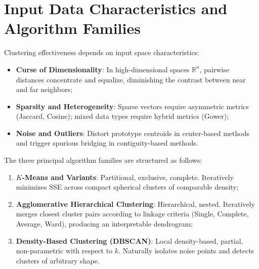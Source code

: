 \section{Input Data Characteristics and Algorithm Families}
\label{sec:dm-data-characteristics-algorithms}

Clustering effectiveness depends on input space characteristics:
\begin{itemize}
    \item \textbf{Curse of Dimensionality}: In high-dimensional spaces $\mathbb{R}^n$, pairwise distances concentrate and equalize, diminishing the contrast between near and far neighbors;
    \item \textbf{Sparsity and Heterogeneity}: Sparse vectors require asymmetric metrics (Jaccard, Cosine); mixed data types require hybrid metrics (Gower);
    \item \textbf{Noise and Outliers}: Distort prototype centroids in center-based methods and trigger spurious bridging in contiguity-based methods.
\end{itemize}

The three principal algorithm families are structured as follows:
\begin{enumerate}
    \item \textbf{$K$-Means and Variants}: Partitional, exclusive, complete. Iteratively minimizes SSE across compact spherical clusters of comparable density;
    \item \textbf{Agglomerative Hierarchical Clustering}: Hierarchical, nested. Iteratively merges closest cluster pairs according to linkage criteria (Single, Complete, Average, Ward), producing an interpretable dendrogram;
    \item \textbf{Density-Based Clustering (DBSCAN)}: Local density-based, partial, non-parametric with respect to $k$. Naturally isolates noise points and detects clusters of arbitrary shape.
\end{enumerate}
